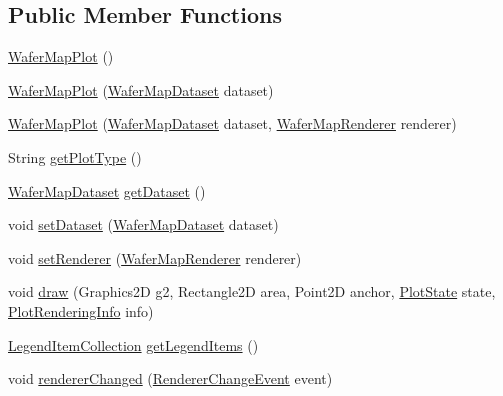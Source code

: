 \subsection*{Public Member Functions}
\begin{DoxyCompactItemize}
\item 
\mbox{\hyperlink{classorg_1_1jfree_1_1chart_1_1plot_1_1_wafer_map_plot_aa1bfd7765194f20a378d539ea06fec2e}{Wafer\+Map\+Plot}} ()
\item 
\mbox{\hyperlink{classorg_1_1jfree_1_1chart_1_1plot_1_1_wafer_map_plot_a2121899a7b2c9b1f33e52ce6b7ffeda4}{Wafer\+Map\+Plot}} (\mbox{\hyperlink{classorg_1_1jfree_1_1data_1_1general_1_1_wafer_map_dataset}{Wafer\+Map\+Dataset}} dataset)
\item 
\mbox{\hyperlink{classorg_1_1jfree_1_1chart_1_1plot_1_1_wafer_map_plot_a37f1c9d71b4fe70b48dd58b5bb5a5840}{Wafer\+Map\+Plot}} (\mbox{\hyperlink{classorg_1_1jfree_1_1data_1_1general_1_1_wafer_map_dataset}{Wafer\+Map\+Dataset}} dataset, \mbox{\hyperlink{classorg_1_1jfree_1_1chart_1_1renderer_1_1_wafer_map_renderer}{Wafer\+Map\+Renderer}} renderer)
\item 
String \mbox{\hyperlink{classorg_1_1jfree_1_1chart_1_1plot_1_1_wafer_map_plot_a1f1f8e96b4b5ba8b0eae2109415ee646}{get\+Plot\+Type}} ()
\item 
\mbox{\hyperlink{classorg_1_1jfree_1_1data_1_1general_1_1_wafer_map_dataset}{Wafer\+Map\+Dataset}} \mbox{\hyperlink{classorg_1_1jfree_1_1chart_1_1plot_1_1_wafer_map_plot_af2cc2b6bb169126d1c4c747da83d39ad}{get\+Dataset}} ()
\item 
void \mbox{\hyperlink{classorg_1_1jfree_1_1chart_1_1plot_1_1_wafer_map_plot_a7017676e60e27f2673a012b80d15a20d}{set\+Dataset}} (\mbox{\hyperlink{classorg_1_1jfree_1_1data_1_1general_1_1_wafer_map_dataset}{Wafer\+Map\+Dataset}} dataset)
\item 
void \mbox{\hyperlink{classorg_1_1jfree_1_1chart_1_1plot_1_1_wafer_map_plot_a6b3fc137e64ac587f5393ede70e043da}{set\+Renderer}} (\mbox{\hyperlink{classorg_1_1jfree_1_1chart_1_1renderer_1_1_wafer_map_renderer}{Wafer\+Map\+Renderer}} renderer)
\item 
void \mbox{\hyperlink{classorg_1_1jfree_1_1chart_1_1plot_1_1_wafer_map_plot_a1ff21e19b204402b9799ca43d636825a}{draw}} (Graphics2D g2, Rectangle2D area, Point2D anchor, \mbox{\hyperlink{classorg_1_1jfree_1_1chart_1_1plot_1_1_plot_state}{Plot\+State}} state, \mbox{\hyperlink{classorg_1_1jfree_1_1chart_1_1plot_1_1_plot_rendering_info}{Plot\+Rendering\+Info}} info)
\item 
\mbox{\hyperlink{classorg_1_1jfree_1_1chart_1_1_legend_item_collection}{Legend\+Item\+Collection}} \mbox{\hyperlink{classorg_1_1jfree_1_1chart_1_1plot_1_1_wafer_map_plot_a508d6ef7b05f37d308ab9ea5d3e5b84c}{get\+Legend\+Items}} ()
\item 
void \mbox{\hyperlink{classorg_1_1jfree_1_1chart_1_1plot_1_1_wafer_map_plot_a82a5490640ce4300ff05197355d1e7fd}{renderer\+Changed}} (\mbox{\hyperlink{classorg_1_1jfree_1_1chart_1_1event_1_1_renderer_change_event}{Renderer\+Change\+Event}} event)
\end{DoxyCompactItemize}
